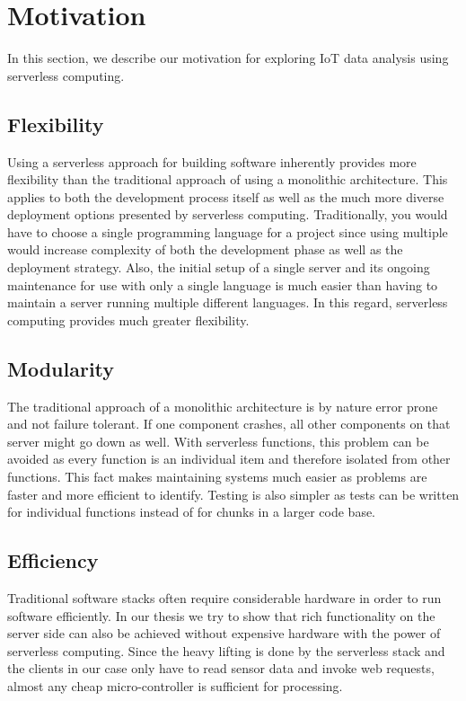 \chapter{Motivation}
\label{sec:motivation}

In this section, we describe our motivation for exploring IoT data analysis using serverless
computing.

\section{Flexibility}

Using a serverless approach for building software inherently provides more flexibility than the
traditional approach of using a monolithic architecture. This applies to both the development
process itself as well as the much more diverse deployment options presented by serverless
computing. Traditionally, you would have to choose a single programming language for a project since
using multiple would increase complexity of both the development phase as well as the deployment
strategy. Also, the initial setup of a single server and its ongoing maintenance for use with only a
single language is much easier than having to maintain a server running multiple different
languages. In this regard, serverless computing provides much greater flexibility.

\section{Modularity}

The traditional approach of a monolithic architecture is by nature error prone and not failure
tolerant. If one component crashes, all other components on that server might go down as well. With
serverless functions, this problem can be avoided as every function is an individual item and
therefore isolated from other functions. This fact makes maintaining systems much easier as problems
are faster and more efficient to identify. Testing is also simpler as tests can be written for
individual functions instead of for chunks in a larger code base.

\section{Efficiency}

Traditional software stacks often require considerable hardware in order to run software
efficiently. In our thesis we try to show that rich functionality on the server side can also be
achieved without expensive hardware with the power of serverless computing. Since the heavy lifting
is done by the serverless stack and the clients in our case only have to read sensor data and invoke
web requests, almost any cheap micro-controller is sufficient for processing.

